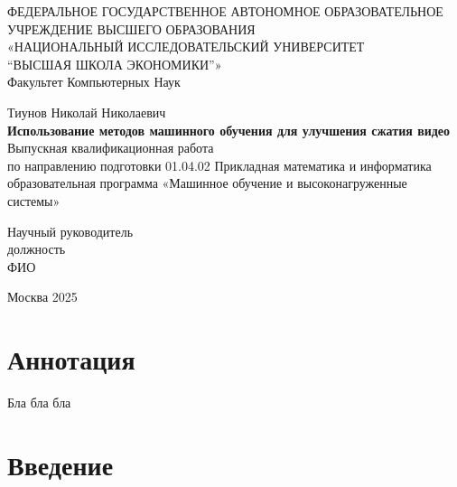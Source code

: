 \documentclass[14pt]{extarticle}
\begin{document}
	\begin{titlepage}
		\begin{center}
			{\normalsize{ФЕДЕРАЛЬНОЕ ГОСУДАРСТВЕННОЕ АВТОНОМНОЕ ОБРАЗОВАТЕЛЬНОЕ УЧРЕЖДЕНИЕ ВЫСШЕГО ОБРАЗОВАНИЯ}}\\
                \vspace{0.1cm}
			{\normalsize{«НАЦИОНАЛЬНЫЙ ИССЛЕДОВАТЕЛЬСКИЙ УНИВЕРСИТЕТ \\ “ВЫСШАЯ ШКОЛА ЭКОНОМИКИ”»}}\\
			\vspace{1cm}
			{\normalsize{Факультет Компьютерных Наук}}\\
                \vspace{1.5cm}


                {\normalsize{Тиунов Николай Николаевич}}\\
                \vspace{0.15cm}
			{\normalsize{\textbf{Использование методов машинного обучения для улучшения сжатия видео}}}\\
                \vspace{0.15cm}
                {\normalsize{Выпускная квалификационная работа}}\\
                {\normalsize{по направлению подготовки 01.04.02 Прикладная математика и информатика}}\\
                {\normalsize{образовательная программа «Машинное обучение и высоконагруженные системы»}} \\
            \end{center}
        \vspace{4.2cm}
        \begin{minipage}{0.4\textwidth}
        \hfill
	\end{minipage}
	\hspace{2cm}
	\begin{minipage}{0.4\textwidth}
		\begin{flushleft}
			{\normalsize{{Научный руководитель}}}\\
                {\normalsize{должность}}\\
                {\normalsize{ФИО}} \\
		\end{flushleft}
	\end{minipage}
            \vspace{4.0cm}
        \begin{center}
            Москва 2025
        \end{center}
        \restoregeometry
	\end{titlepage}

\section*{Аннотация}
Бла бла бла

\newpage

\tableofcontents
\newpage

\section*{Введение}

\newpage


\end{document}
